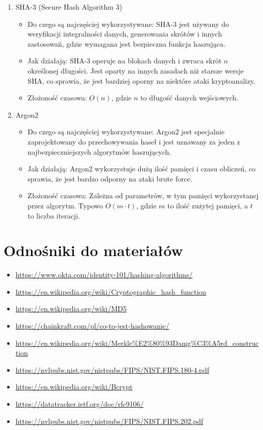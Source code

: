 \documentclass{article}
\begin{document}
\begin{enumerate}
    \item SHA-3 (Secure Hash Algorithm 3)
    \begin{itemize}
        \item[] Do czego są najczęściej wykorzystywane: SHA-3 jest używany do weryfikacji integralności danych, generowania skrótów i innych zastosowań, gdzie wymagana jest bezpieczna funkcja haszująca.
        \\
        \item[] Jak działają: SHA-3 operuje na blokach danych i zwraca skrót o określonej długości. Jest oparty na innych zasadach niż starsze wersje SHA, co sprawia, że jest bardziej oporny na niektóre ataki kryptoanalizy.
        \\
        \item[] Złożoność czasowa: $O(n)$, gdzie $n$ to długość danych wejściowych.
    \end{itemize}
    
    \item Argon2
    \begin{itemize}
        \item[] Do czego są najczęściej wykorzystywane: Argon2 jest specjalnie zaprojektowany do przechowywania haseł i jest uznawany za jeden z najbezpieczniejszych algorytmów haszujących.
        \\
        \item[] Jak działają: Argon2 wykorzystuje dużą ilość pamięci i czasu obliczeń, co sprawia, że jest bardzo odporny na ataki brute force.
        \\
        \item[] Złożoność czasowa: Zależna od parametrów,
        w tym pamięci wykorzystanej przez algorytm.
        Typowo $O(m \cdot t)$, gdzie $m$ to ilość zużytej pamięci, a $t$ to liczba iteracji.
    \end{itemize}
\end{enumerate}

\newpage
\section{Odnośniki do materiałów}
\begin{itemize}
    \item \url{https://www.okta.com/identity-101/hashing-algorithms/}
    \item \url{https://en.wikipedia.org/wiki/Cryptographic_hash_function}
    \item \url{https://en.wikipedia.org/wiki/MD5}
    \item \url{https://chainkraft.com/pl/co-to-jest-hashowanie/}
    \item \url{https://en.wikipedia.org/wiki/Merkle%E2%80%93Damg%C3%A5rd_construction}
    \item \url{https://nvlpubs.nist.gov/nistpubs/FIPS/NIST.FIPS.180-4.pdf}
    \item \url{https://en.wikipedia.org/wiki/Bcrypt}
    \item \url{https://datatracker.ietf.org/doc/rfc9106/}
    \item \url{https://nvlpubs.nist.gov/nistpubs/FIPS/NIST.FIPS.202.pdf}
\end{itemize}
\end{document}

